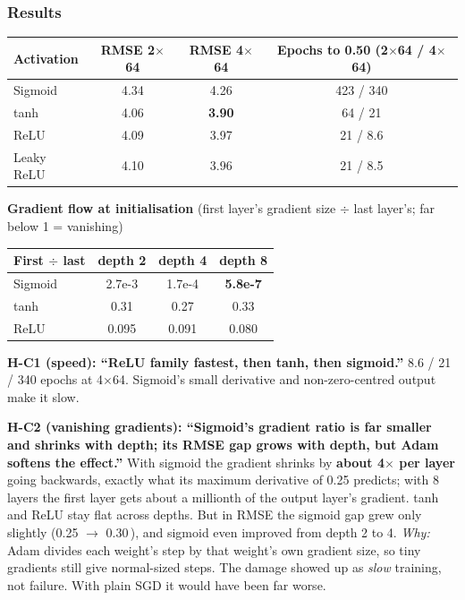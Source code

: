 \documentclass[11pt,a4paper]{article}
\newcommand{\A}{\,\text{\AA}}
\newcommand{\verdict}[1]{\fbox{\footnotesize\textbf{#1}}}
\begin{document}
\subsubsection*{Results}
\begin{center}
\small
\begin{tabular}{@{}lccc@{}}
\toprule
Activation & RMSE 2$\times$64 & RMSE 4$\times$64 & Epochs to 0.50 (2$\times$64 / 4$\times$64) \\
\midrule
Sigmoid & 4.34 & 4.26 & 423 / 340 \\
tanh & 4.06 & \textbf{3.90} & 64 / 21 \\
ReLU & 4.09 & 3.97 & 21 / 8.6 \\
Leaky ReLU & 4.10 & 3.96 & 21 / 8.5 \\
\bottomrule
\end{tabular}

\medskip
\textbf{Gradient flow at initialisation} (first layer's gradient size $\div$ last layer's; far below 1 = vanishing)\\[0.3em]
\begin{tabular}{@{}lccc@{}}
\toprule
First $\div$ last & depth 2 & depth 4 & depth 8 \\
\midrule
Sigmoid & 2.7e-3 & 1.7e-4 & \textbf{5.8e-7} \\
tanh & 0.31 & 0.27 & 0.33 \\
ReLU & 0.095 & 0.091 & 0.080 \\
\bottomrule
\end{tabular}
\end{center}

\textbf{H-C1 (speed): ``ReLU family fastest, then tanh, then sigmoid.''} \verdict{Supported}
8.6 / 21 / 340 epochs at 4$\times$64. Sigmoid's small derivative and non-zero-centred output make it slow.

\textbf{H-C2 (vanishing gradients): ``Sigmoid's gradient ratio is far smaller and shrinks with depth; its RMSE gap grows with
depth, but Adam softens the effect.''} \verdict{Supported}
With sigmoid the gradient shrinks by \textbf{about 4$\times$ per layer} going backwards, exactly what its maximum derivative
of 0.25 predicts; with 8 layers the first layer gets about a millionth of the output layer's gradient. tanh and ReLU stay
flat across depths. But in RMSE the sigmoid gap grew only slightly (0.25 $\to$ 0.30\A), and sigmoid even improved from
depth 2 to 4. \emph{Why:} Adam divides each weight's step by that weight's own gradient size, so tiny gradients still give
normal-sized steps. The damage showed up as \emph{slow} training, not failure. With plain SGD it would have been far worse.
\end{document}
